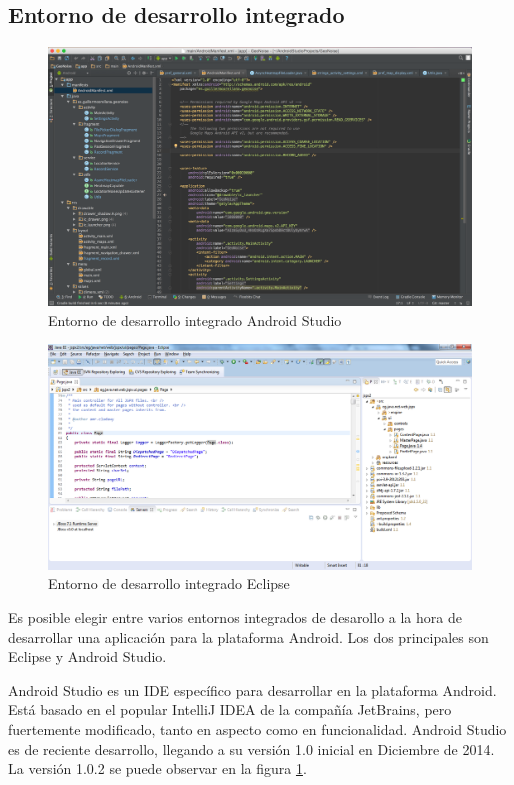 \subsection{Entorno de desarrollo integrado}
\label{sec:IDE}
\begin{figure}[h] \centering
    \includegraphics[width=12cm]{graphs/intellij.png} \caption{Entorno de desarrollo integrado Android Studio}\label{fig:astudio}
\end{figure}
 \begin{figure}[h] \centering
    \includegraphics[width=12cm]{graphs/eclipse.png} \caption{Entorno de desarrollo integrado Eclipse}\label{fig:eclipse}
\end{figure}
    Es posible elegir entre varios entornos integrados de desarollo a la hora de desarrollar una aplicación para la plataforma Android. Los dos principales son Eclipse y Android Studio.
    
    Android Studio es un \ac{IDE} específico para desarrollar en la plataforma Android. Está basado en el popular IntelliJ IDEA de la compañía JetBrains, pero fuertemente modificado, tanto en aspecto como en funcionalidad. Android Studio es de reciente desarrollo, llegando a su versión 1.0 inicial en Diciembre de 2014. La versión 1.0.2 se puede observar en la figura \ref{fig:astudio}.

